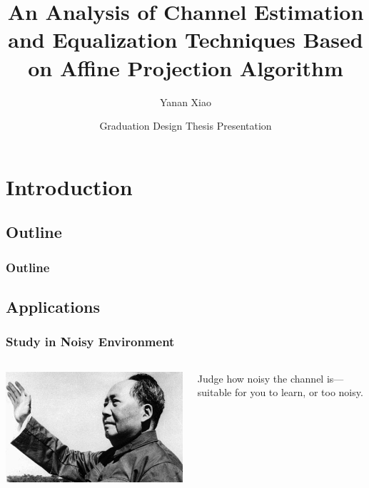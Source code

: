 \documentclass[12pt,hyperref=true,mathserif]{beamer}
\begin{document}
\title[CE APA Analysis]{An Analysis of Channel Estimation and Equalization Techniques
Based on Affine Projection Algorithm}
\author{Yanan Xiao}
\date[Defense \& Presentation]{Graduation Design Thesis Presentation}

\begin{frame}
\titlepage
\end{frame}
\section{Introduction}
\subsection{Outline}
\begin{frame}[shrink]
\frametitle{Outline}
\tableofcontents
\end{frame}

\subsection{Applications}
\begin{frame}
\frametitle{Study in Noisy Environment}
\begin{columns}
\begin{column}{0.5\textwidth}
\includegraphics[scale=0.35]{ChairmanMao.jpg}
\end{column}
\begin{column}{0.5\textwidth}
Judge how noisy the channel is---suitable for you to learn, or too noisy.
\end{column}
\end{columns}
\end{frame}
\end{document}
